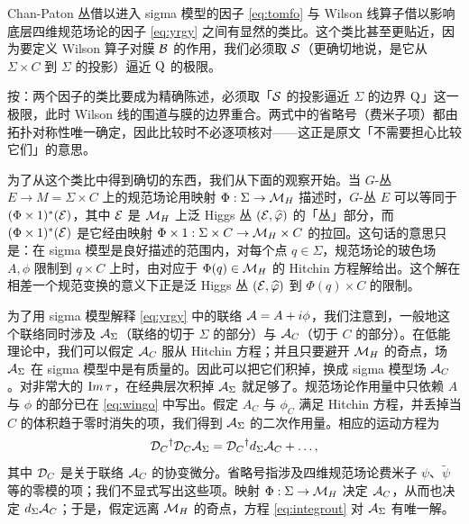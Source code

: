 Chan-Paton 丛借以进入 sigma 模型的因子 \eqref{eq:tomfo} 与 Wilson 线算子借以影响底层四维规范场论的因子 \eqref{eq:yrgy} 之间有显然的类比。这个类比甚至更贴近，因为要定义 Wilson 算子对膜 ${\cal B}$ 的作用，我们必须取 ${\cal S}$（更确切地说，是它从 $\Sigma\times C$ 到 $\Sigma$ 的投影）逼近 $\eurm Q$ 的极限。

\begin{yizhu}[含糊点拨]
按：两个因子的类比要成为精确陈述，必须取「${\cal S}$ 的投影逼近 $\Sigma$ 的边界 $\eurm Q$」这一极限，此时 Wilson 线的围道与膜的边界重合。两式中的省略号（费米子项）都由拓扑对称性唯一确定，因此比较时不必逐项核对——这正是原文「不需要担心比较它们」的意思。
\end{yizhu}

为了从这个类比中得到确切的东西，我们从下面的观察开始。当 $G$-丛 $E\to M=\Sigma\times C$ 上的规范场论用映射 $\Phi:\Sigma\to \MH$ 描述时，$G$-丛 $E$ 可以等同于 $(\Phi\times 1)^*({\EUE})$，其中 ${\EUE}$ 是 $\MH$ 上泛 Higgs 丛 $({\EUE},\hat\varphi)$ 的「丛」部分，而 $(\Phi\times 1)^*({\EUE})$ 是它经由映射 $\Phi\times 1:\Sigma\times C\to \MH\times C$ 的拉回。这句话的意思只是：在 sigma 模型是良好描述的范围内，对每个点 $q\in \Sigma$，规范场论的玻色场 $A,\phi$ 限制到 $q\times C$ 上时，由对应于 $\Phi(q)\in \MH$ 的 Hitchin 方程解给出。这个解在相差一个规范变换的意义下正是泛 Higgs 丛 $({\EUE},\hat\varphi)$ 到 $\Phi(q)\times C$ 的限制。

为了用 sigma 模型解释 \eqref{eq:yrgy} 中的联络 ${\cal A}=A+i\phi$，我们注意到，一般地这个联络同时涉及 $\cA_\Sigma$（联络的切于 $\Sigma$ 的部分）与 $\cA_C$（切于 $C$ 的部分）。在低能理论中，我们可以假定 $\cA_C$ 服从 Hitchin 方程；并且只要避开 $\MH$ 的奇点，场 $\cA_\Sigma$ 在 sigma 模型中是有质量的。因此可以把它们积掉，换成 sigma 模型场 $\cA_C$。对非常大的 ${\rm Im}\,\tau$，在经典层次积掉 $\cA_\Sigma$ 就足够了。规范场论作用量中只依赖 $A$ 与 $\phi$ 的部分已在 \eqref{eq:wingo} 中写出。假定 $A_C$ 与 $\phi_C$ 满足 Hitchin 方程，并丢掉当 $C$ 的体积趋于零时消失的项，我们得到 $\cA_\Sigma$ 的二次作用量。相应的运动方程为
\setcounter{equation}{2}
\begin{equation}\label{eq:integrout}
\cD_C{}^\dagger \cD_C \cA_\Sigma=\cD_C{}^\dagger
d_\Sigma \cA_C+\dots,
\end{equation}
 其中 $\cD_C$ 是关于联络 $\cA_C$ 的协变微分。省略号指涉及四维规范场论费米子 $\psi$、$\tilde\psi$ 等的零模的项；我们不显式写出这些项。映射 $\Phi:\Sigma\to \MH$ 决定 $\cA_C$，从而也决定 $d_\Sigma \cA_C$；于是，假定远离 $\MH$ 的奇点，方程 \eqref{eq:integrout} 对 $\cA_\Sigma$ 有唯一解。

